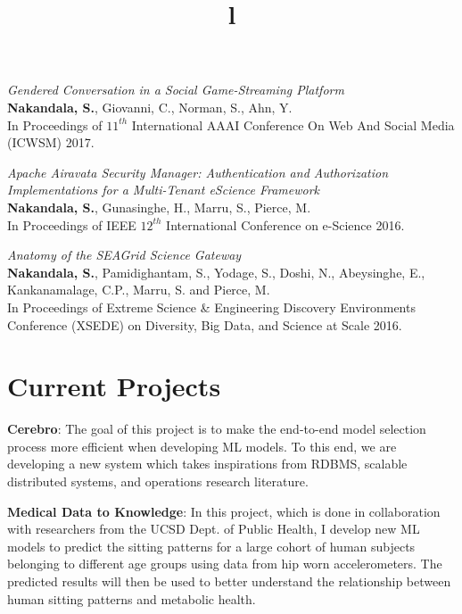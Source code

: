\documentclass[margin]{res}
\begin{document}
\begin{resume}
\par
\textit{Gendered Conversation in a Social Game-Streaming Platform} \\
\textbf{Nakandala, S.}, Giovanni, C., Norman, S., Ahn, Y. \\
In Proceedings of $11^{th}$ International AAAI Conference On Web And Social Media (ICWSM) 2017.

\par
\textit{Apache Airavata Security Manager: Authentication and Authorization Implementations for a Multi-Tenant eScience Framework
} \\
\textbf{Nakandala, S.}, Gunasinghe, H., Marru, S., Pierce, M. \\
In Proceedings of IEEE $12^{th}$ International Conference on e-Science 2016.

\par
\textit{Anatomy of the SEAGrid Science Gateway} \\
\textbf{Nakandala, S.}, Pamidighantam, S., Yodage, S., Doshi, N., Abeysinghe, E., Kankanamalage, C.P., Marru, S. and Pierce, M. \\
In Proceedings of Extreme Science \& Engineering Discovery Environments Conference (XSEDE) on Diversity, Big Data, and Science at Scale 2016.


\section{Current Projects}
\par
\textbf{Cerebro}: 
The goal of this project is to make the end-to-end model selection process more efficient when developing ML models. To this end, we are developing a new system which takes inspirations from RDBMS, scalable distributed systems, and operations research literature.

\par
\textbf{Medical Data to Knowledge}: 
In this project, which is done in collaboration with researchers from the UCSD Dept. of Public Health, I develop new ML models to predict the sitting patterns for a large cohort of human subjects belonging to different age groups using data from hip worn accelerometers. The predicted results will then be used to better understand the relationship between human sitting patterns and metabolic health.


\begin{format}
\title{l}  \\
\\
\body\\
\end{format}
\renewcommand{\labelitemi}{{\tiny$\bullet$}}

\end{resume}
\end{document}
